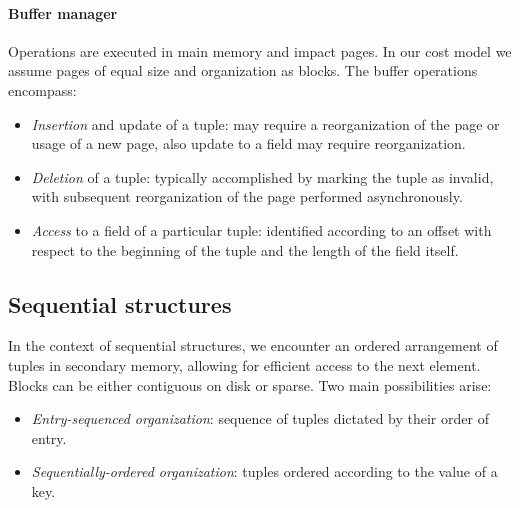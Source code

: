 \paragraph*{Buffer manager}
Operations are executed in main memory and impact pages.
In our cost model we assume pages of equal size and organization as blocks. 
The buffer operations encompass:
\begin{itemize}
    \item \textit{Insertion} and update of a tuple: may require a reorganization of the page or usage of a new page, also update to a field may require reorganization.
    \item \textit{Deletion} of a tuple: typically accomplished by marking the tuple as invalid, with subsequent reorganization of the page performed asynchronously.
    \item \textit{Access} to a field of a particular tuple: identified according to an offset with respect to the beginning of the tuple and the length of the field itself.
\end{itemize}

\subsection{Sequential structures}
In the context of sequential structures, we encounter an ordered arrangement of tuples in secondary memory, allowing for efficient access to the next element. 
Blocks can be either contiguous on disk or sparse. 
Two main possibilities arise:
\begin{itemize}
    \item \textit{Entry-sequenced organization}: sequence of tuples dictated by their order of entry. 
    \item \textit{Sequentially-ordered organization}: tuples ordered according to the value of a key. 
\end{itemize}

